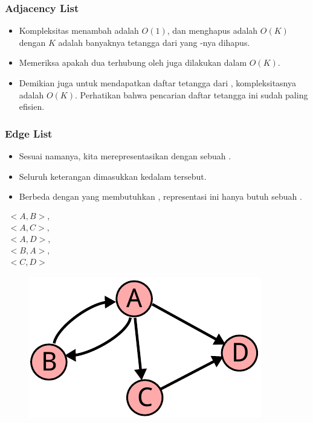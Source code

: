 \begin{frame}
\frametitle{Adjacency List}
\begin{itemize}
  \item Kompleksitas menambah \fedge adalah $O(1)$, dan menghapus adalah $O(K)$ dengan $K$ adalah banyaknya tetangga dari \fnode yang \fedge-nya dihapus.
  \item Memeriksa apakah dua \fnode terhubung oleh \fedge juga dilakukan dalam $O(K)$.
  \item Demikian juga untuk mendapatkan daftar tetangga dari \fnode, kompleksitasnya adalah $O(K)$. Perhatikan bahwa pencarian daftar tetangga ini sudah paling efisien.
\end{itemize}
\end{frame}

\begin{frame}
\frametitle{Edge List}
\begin{itemize}
  \item Sesuai namanya, kita merepresentasikan \fgraph dengan sebuah \flist.
  \item Seluruh keterangan \fedge dimasukkan kedalam \flist tersebut.
  \item Berbeda dengan \fadjacencylist yang membutuhkan , representasi ini hanya butuh sebuah \flist.
\end{itemize}
\begin{center}
\begin{multicols}{2}
  $\begin{array}{l}
    <A, B>, \\
    <A, C>, \\
    <A, D>, \\
    <B, A>, \\
    <C, D> 
  \end{array}$
  \break
  \begin{figure}
    \includegraphics[width=4 cm]{asset/unweighted-directed.pdf}
  \end{figure}
\end{multicols} 
\end{center}
\end{frame}

